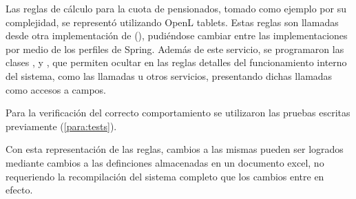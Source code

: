 
Las reglas de cálculo para la cuota de pensionados, tomado como ejemplo por su complejidad, se representó utilizando OpenL tablets. 
%
Estas reglas son llamadas desde otra implementación de (), pudiéndose cambiar entre las implementaciones por medio de los perfiles de Spring. Además de este servicio, se programaron las clases ,  y , que permiten ocultar en las reglas detalles del funcionamiento interno del sistema, como las llamadas u otros servicios, presentando dichas llamadas como accesos a campos.

Para la verificación del correcto comportamiento se utilizaron las pruebas escritas previamente (\cref{para:tests}).

Con esta representación de las reglas, cambios a las mismas pueden ser logrados mediante cambios a las definciones almacenadas en un documento excel, no requeriendo la recompilación del sistema completo que los cambios entre en efecto.

